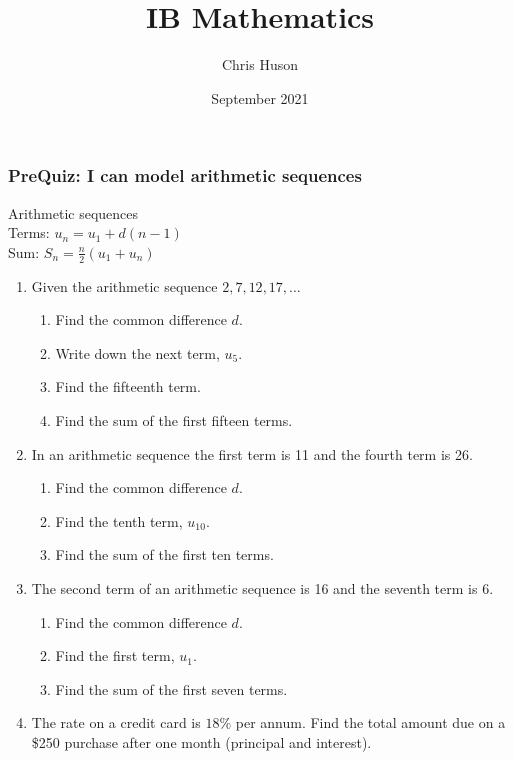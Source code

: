 \documentclass[12pt, twoside]{article}
\title{IB Mathematics}
\author{Chris Huson}
\date{September 2021}
\begin{document}
\subsubsection*{PreQuiz: I can model arithmetic sequences}
Arithmetic sequences\\[0.25cm]
Terms: $u_n=u_1 + d(n-1)$\\[0.25cm]
Sum: $\displaystyle S_n= \frac{n}{2}(u_1 + u_n)$\\[0.25cm]

\begin{enumerate}
\item Given the arithmetic sequence $2, 7, 12, 17, \dots$
  \begin{enumerate}[itemsep=1cm]
    \item Find the common difference $d$.
    \item Write down the next term, $u_5$.
    \item Find the fifteenth term.\vspace{1cm}
    \item Find the sum of the first fifteen terms.
  \end{enumerate} \vspace{2cm}

\item In an arithmetic sequence the first term is 11 and the fourth term is 26.
  \begin{enumerate}[itemsep=2cm]
    \item Find the common difference $d$.
    \item Find the tenth term, $u_{10}$.\vspace{1cm}
    \item Find the sum of the first ten terms.
  \end{enumerate} \vspace{3cm}

\newpage
\item The second term of an arithmetic sequence is 16 and the seventh term is 6.
  \begin{enumerate}[itemsep=3cm]
    \item Find the common difference $d$.
    \item Find the first term, $u_{1}$.
    \item Find the sum of the first seven terms.
  \end{enumerate} \vspace{2cm}

\item The rate on a credit card is $18\%$ per annum. Find the total amount due on a \$250 purchase after one month (principal and interest). \vspace{3cm}


\end{enumerate}
\end{document}

